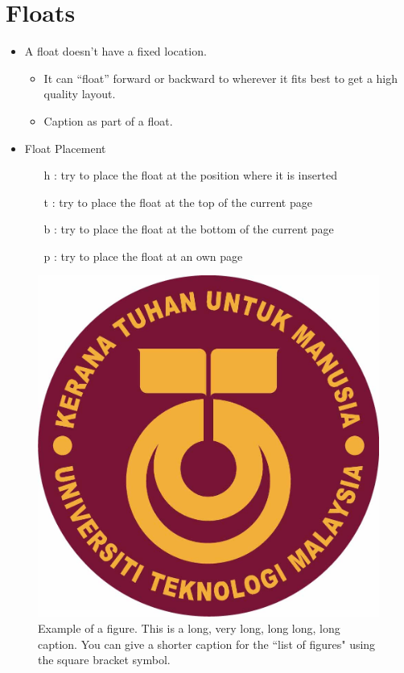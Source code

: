 \documentclass[oneside]{utmthesis}
\begin{document}
\section{Floats}
\begin{itemize}
\item A float doesn't have a fixed location. 
\begin{itemize}
\item It can ``float'' forward or backward to wherever it fits best to
get a high quality layout. 
\item Caption as part of a float.
\end{itemize}
\item Float Placement
\begin{itemize}
\item [h]: try to place the float at the
position where it is inserted 
\item [t]: try to place the float at the top
of the current page
\item [b]: try to place the float at the
bottom of the current page
\item [p]: try to place the float at an own
page 
\end{itemize}
\end{itemize}

\begin{figure}[!ht]
	\centering
	\includegraphics[width=0.5\linewidth]{./figs/utm02}
	\caption{Example of a figure. This is a long, very long, long long, long caption.  You can give a shorter caption for the ``list of figures" using the square bracket symbol.}
\end{figure}
\end{document}
